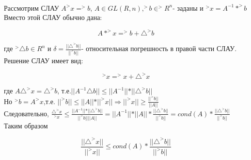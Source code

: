 \documentclass[__main__.tex]{subfiles}
\begin{document}
\begin{definition}\\
	Рассмотрим СЛАУ $A ^>x = ^>b$, $A\in GL(R,n), ^>b\in ^>R^n$- заданы и $^>x=A^{-1}* ^>b$\\
	Вместо этой СЛАУ обычно дана:
	
	$$A* ^>x= ^>b + \triangle^> b$$
	
	где $^>\triangle b \in R^n$ и $\delta=\frac{\vert\vert\triangle^> b\vert\vert}{\vert\vert ^>b\vert\vert}$- относительная погрешность в правой части СЛАУ.\\
	Решение СЛАУ имеет вид:
	
	$$^>x=^>x + \triangle^> x$$
	
	где $A \triangle^> x=  \triangle^> b$, т.е.$\vert\vert A^{-1} \triangle b \vert\vert \leq \vert\vert A^{-1}\vert\vert *\vert\vert \triangle^> b\vert\vert$\\
	Но $^>b=A ^>x$,т.е. $\vert\vert ^>b\vert\vert \leq \vert\vert A\vert\vert*\vert\vert^>x\vert\vert \Rightarrow \vert\vert ^>x\vert\vert \geq \frac{\vert\vert^>b\vert\vert}{\vert\vert A \vert\vert}$\\
	Следовательно, $\frac{\triangle^> x}{^>x}\leq \frac{\vert\vert A^{-1}\vert\vert * \vert\vert \triangle^> b \vert\vert}{\vert\vert ^>b \vert\vert \vert\vert A\vert\vert}=\vert\vert A^{-1}\vert\vert * \vert\vert A \vert\vert * \frac{\vert\vert \triangle^> b\vert\vert}{\vert\vert ^>b \vert\vert}= cond(A)*\frac{\vert\vert \triangle^> b\vert\vert}{\vert\vert ^>b \vert\vert}$\\
	Таким образом 
	
	$$\frac{\vert\vert  \triangle^> x \vert\vert}{\vert\vert ^>x\vert\vert}\leq cond(A)*\frac{\vert\vert \triangle^> b\vert\vert}{\vert\vert ^>b \vert\vert}$$
\end{definition}
\end{document}
